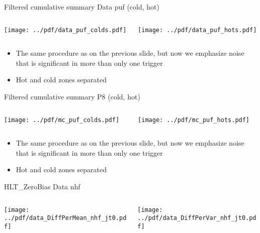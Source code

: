 \documentclass[9pt]{beamer}
\begin{document}
\begin{frame}[t]{Filtered cumulative summary Data puf (cold, hot)}
\begin{columns}[T]
  \begin{column}{.5\textwidth}
  \texttt{[image: ../pdf/data\_puf\_colds.pdf]}
  \end{column}
  \begin{column}{.5\textwidth}
  \texttt{[image: ../pdf/data\_puf\_hots.pdf]}
  \end{column}
\end{columns}
\begin{itemize}
 \item The same procedure as on the previous slide, but now we emphasize noise that is significant in more than only one trigger
 \item Hot and cold zones separated
\end{itemize}
\end{frame}

\begin{frame}[t]{Filtered cumulative summary P8 (cold, hot)}
\begin{columns}[T]
  \begin{column}{.5\textwidth}
  \texttt{[image: ../pdf/mc\_puf\_colds.pdf]}
  \end{column}
  \begin{column}{.5\textwidth}
  \texttt{[image: ../pdf/mc\_puf\_hots.pdf]}
  \end{column}
\end{columns}
\begin{itemize}
 \item The same procedure as on the previous slide, but now we emphasize noise that is significant in more than only one trigger
 \item Hot and cold zones separated
\end{itemize}
\end{frame}


\begin{frame}[t]{HLT\_ZeroBias Data nhf}
\begin{columns}[T]
  \begin{column}{.5\textwidth}
  \texttt{[image: ../pdf/data\_DiffPerMean\_nhf\_jt0.pdf]}
  \end{column}
  \begin{column}{.5\textwidth}
  \texttt{[image: ../pdf/data\_DiffPerVar\_nhf\_jt0.pdf]}
  \end{column}
\end{columns}
\end{frame}
\end{document}

